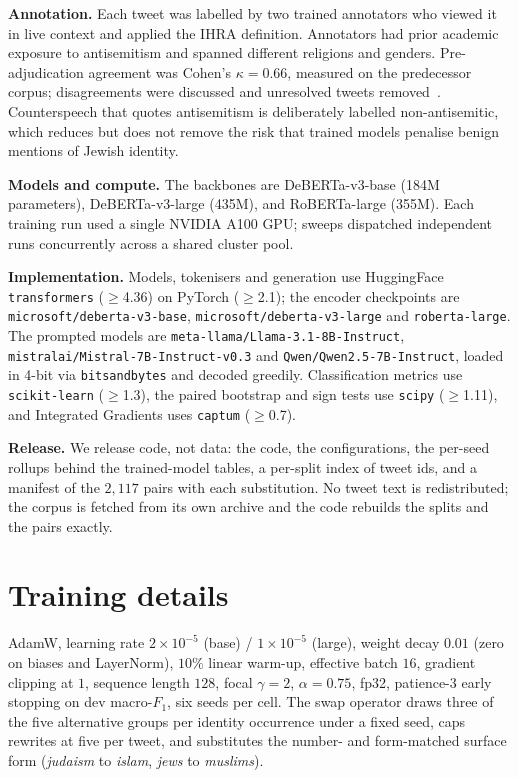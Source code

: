 \documentclass[11pt]{article}
\begin{document}
\textbf{Annotation.} Each tweet was labelled by two trained annotators who viewed it in live context and applied the IHRA definition. Annotators had prior academic exposure to antisemitism and spanned different religions and genders. Pre-adjudication agreement was Cohen's $\kappa{=}0.66$, measured on the predecessor corpus; disagreements were discussed and unresolved tweets removed~\citep{jikeli2023antisemitic}. Counterspeech that quotes antisemitism is deliberately labelled non-antisemitic, which reduces but does not remove the risk that trained models penalise benign mentions of Jewish identity.

\textbf{Models and compute.} The backbones are DeBERTa-v3-base (184M parameters), DeBERTa-v3-large (435M), and RoBERTa-large (355M). Each training run used a single NVIDIA A100 GPU; sweeps dispatched independent runs concurrently across a shared cluster pool.

\textbf{Implementation.} Models, tokenisers and generation use HuggingFace \texttt{transformers} ($\ge$4.36) on PyTorch ($\ge$2.1); the encoder checkpoints are \texttt{microsoft/deberta-v3-base}, \texttt{microsoft/deberta-v3-large} and \texttt{roberta-large}. The prompted models are \texttt{meta-llama/Llama-3.1-8B-Instruct}, \texttt{mistralai/Mistral-7B-Instruct-v0.3} and \texttt{Qwen/Qwen2.5-7B-Instruct}, loaded in 4-bit via \texttt{bitsandbytes} and decoded greedily. Classification metrics use \texttt{scikit-learn} ($\ge$1.3), the paired bootstrap and sign tests use \texttt{scipy} ($\ge$1.11), and Integrated Gradients uses \texttt{captum} ($\ge$0.7).


\textbf{Release.} We release code, not data: the code, the configurations, the per-seed rollups behind the trained-model tables, a per-split index of tweet ids, and a manifest of the $2{,}117$ pairs with each substitution. No tweet text is redistributed; the corpus is fetched from its own archive and the code rebuilds the splits and the pairs exactly.

\FloatBarrier
\section{Training details}
\label{app:training}
AdamW, learning rate $2{\times}10^{-5}$ (base) / $1{\times}10^{-5}$ (large), weight decay $0.01$ (zero on biases and LayerNorm), $10\%$ linear warm-up, effective batch $16$, gradient clipping at $1$, sequence length $128$, focal $\gamma{=}2$, $\alpha{=}0.75$, fp32, patience-3 early stopping on dev macro-$F_1$, six seeds per cell. The swap operator draws three of the five alternative groups per identity occurrence under a fixed seed, caps rewrites at five per tweet, and substitutes the number- and form-matched surface form (\emph{judaism} to \emph{islam}, \emph{jews} to \emph{muslims}).
\end{document}
